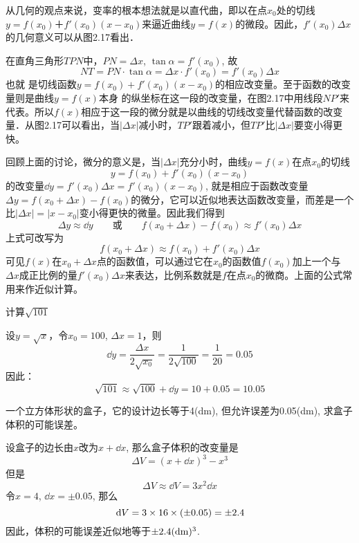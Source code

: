 从几何的观点来说，变率的根本想法就是以直代曲，即以在点$x_0$处的切线$y=f(x_0)＋f'(x_0)(x-x_0)$来逼近曲线$y=f(x)$的微段。因此，$f'(x_0)\Delta x$的几何意义可以从图2.17看出．

\begin{figure}[htp]
    \centering
    
    \caption{}
\end{figure}

在直角三角形$TPN$中，$PN=\Delta x$, $\tan\alpha=f'(x_0)$, 故
\[NT=PN\cdot \tan\alpha=\Delta x\cdot f'(x_0)=f'(x_0)\Delta x\]
也就
是切线函数$y=f (x_0) +f' (x_0) (x-x_0)$的相应改变量。至于函数的改变量则是曲线$y=f(x)$本身
的纵坐标在这一段的改变量，在图2.17中用线段$NP'$来代表。所以$f(x)$相应于这一段的微分就是以曲线的切线改变量代替函数的改变量．从图2.17可以看出，当$|\Delta x|$减小时，$TP'$跟着减小，但$TP'$比$|\Delta x|$要变小得更快。

回顾上面的讨论，微分的意义是，当$|\Delta x|$充分小时，曲线$y=f(x)$在点$x_0$的切线
\[y=f (x_0) +f' (x_0) (x-x_0)\]
的改变量$\dd y=f'(x_0)\Delta x=f'(x_0)(x-x_0)$, 就是相应于函数改变量$\Delta y=f(x_0+\Delta x)-f(x_0)$的微分，它可以近似地表达函数改变量，而差是一个比$|\Delta x|=|x-x_0|$变小得更快的微量。因此我们得到
\[\Delta y\approx \dd y\qquad \text{或}\qquad f(x_0+\Delta x)-f(x_0)\approx f'(x_0)\Delta x\]
上式可改写为
\[f (x_0+\Delta x) \approx f (x_0) +f' (x_0) \Delta x\]
可见$f(x)$在$x_0+\Delta x$点的函数值，可以通过它在$x_0$的函数值$f(x_0)$加上一个与$\Delta x$成正比例的量$f'(x_0)\Delta x$来表达，比例系数就是$f$在点$x_0$的微商。上面的公式常用来作近似计算。

\begin{example}
    计算$\sqrt{101}$
\end{example}


\begin{solution}
设$y=\sqrt{x}$，令$x_0=100$, $\Delta x=1$，则
\[\dd y=\frac{\Delta x}{2\sqrt{x_0}}=\frac{1}{2\sqrt{100}}=\frac{1}{20}=0.05\]
因此：
\[\sqrt{101}\approx \sqrt{100}+\dd y=10+0.05=10.05\]
\end{solution}



\begin{example}
一个立方体形状的盒子，它的设计边长等于4(dm), 但允许误差为0.05(dm), 求盒子体积的可能误差。
\end{example}


\begin{solution}
设盒子的边长由$x$改为$x+\dd x$, 那么盒子体积的改变量是
\[\Delta V= (x+\dd x)^3-x^3\]
但是
\[\Delta V\approx \dd V=3x^2\dd x\]
令$x=4$, $\dd x=\pm 0.05$, 那么
\[\,{\rm d} V=3\times16\times (\pm 0. 05) =\pm 2.4\]
因此，体积的可能误差近似地等于$\pm 2.4({\rm dm})^3$.
\end{solution}


